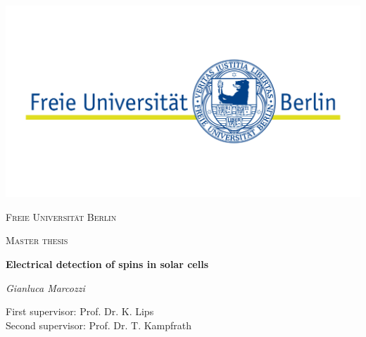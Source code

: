 \documentclass[a4paper]{book}
\begin{document}
	\begin{titlepage}
		\thispagestyle{empty}
		\centering
		\includegraphics[width=\textwidth]{images/fu_logo}\par\vspace{1cm}
		{\scshape\LARGE Freie Universität Berlin \par}
		\vspace{1cm}
		{\scshape\Large Master thesis \par}
		\vspace{1.5cm}
		{\huge\bfseries Electrical detection of spins in solar cells \par}
		\vspace{2cm}
		{\Large\itshape Gianluca Marcozzi \par}
		\vfill

	\end{titlepage}
	
	\thispagestyle{empty}
	\null\vfill
	\begin{center}
		{\large First supervisor: Prof. Dr. K. Lips\\
			Second supervisor: Prof. Dr. T. Kampfrath \par}
	\end{center}
	\clearpage
	
	\setcounter{page}{1}
	
	\clearpage
	\tableofcontents
	
	
\end{document}
